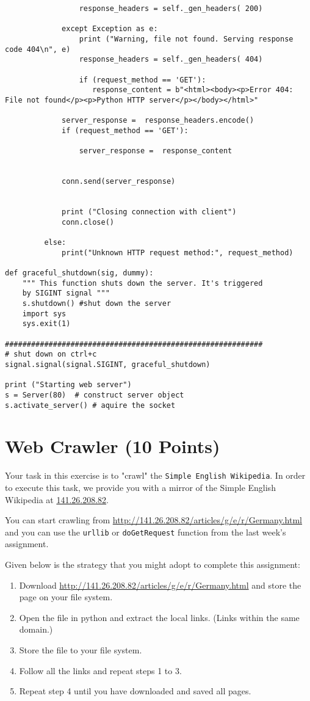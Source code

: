 \documentclass{WeSTassignment}
\begin{document}
\begin{lstlisting}
                 response_headers = self._gen_headers( 200)

             except Exception as e:
                 print ("Warning, file not found. Serving response code 404\n", e)
                 response_headers = self._gen_headers( 404)

                 if (request_method == 'GET'):
                    response_content = b"<html><body><p>Error 404: File not found</p><p>Python HTTP server</p></body></html>"

             server_response =  response_headers.encode()
             if (request_method == 'GET'):

                 server_response =  response_content


             conn.send(server_response)


             print ("Closing connection with client")
             conn.close()

         else:
             print("Unknown HTTP request method:", request_method)

def graceful_shutdown(sig, dummy):
    """ This function shuts down the server. It's triggered
    by SIGINT signal """
    s.shutdown() #shut down the server
    import sys
    sys.exit(1)

###########################################################
# shut down on ctrl+c
signal.signal(signal.SIGINT, graceful_shutdown)

print ("Starting web server")
s = Server(80)  # construct server object
s.activate_server() # aquire the socket

\end{lstlisting}
\section{Web Crawler (10 Points)}
Your task in this exercise is to "crawl" the \texttt{Simple English Wikipedia}. In order to execute this task, we provide you with a mirror of the Simple English Wikipedia at \url{141.26.208.82}. 

You can start crawling from \url{http://141.26.208.82/articles/g/e/r/Germany.html} and you can use the \texttt{urllib} or \texttt{doGetRequest} function from the last week's assignment.

Given below is the strategy that you might adopt to complete this assignment: 
\begin{enumerate}
\item Download \url{http://141.26.208.82/articles/g/e/r/Germany.html} and store the page on your file system. 
\item Open the file in python and extract the local links. (Links within the same domain.)
\item Store the file to your file system.
\item Follow all the links and repeat steps 1 to 3.
\item Repeat step 4 until you have downloaded and saved all pages. 
\end{enumerate}
\end{document}
